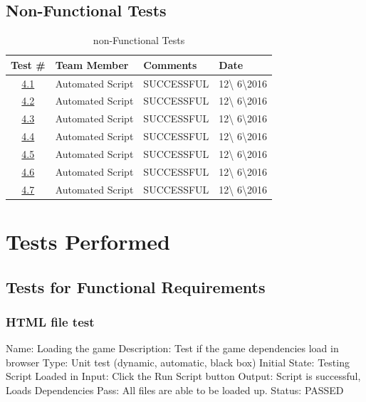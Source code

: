 \documentclass{article}
\begin{document}
\subsection{Non-Functional Tests}
\begin{table}[H]
\caption{non-Functional Tests}
	\begin{tabularx}{\textwidth}{| c | l | X | l |}
	\toprule
	Test \#& Team Member &Comments &Date\\
	\midrule
	\hyperref[sec:4.1]{4.1}& Automated Script  & SUCCESSFUL & 12\textbackslash
	6\textbackslash2016\\
	\hyperref[sec:4.2]{4.2}& Automated Script  & SUCCESSFUL & 12\textbackslash
	6\textbackslash2016\\
	\hyperref[sec:4.3]{4.3}& Automated Script  & SUCCESSFUL & 12\textbackslash
	6\textbackslash2016\\
	\hyperref[sec:4.4]{4.4}& Automated Script  & SUCCESSFUL & 12\textbackslash
	6\textbackslash2016\\
	\hyperref[sec:4.5]{4.5}& Automated Script  & SUCCESSFUL & 12\textbackslash
	6\textbackslash2016\\
	\hyperref[sec:4.6]{4.6}& Automated Script  & SUCCESSFUL & 12\textbackslash
	6\textbackslash2016\\
	\hyperref[sec:4.7]{4.7}& Automated Script  & SUCCESSFUL & 12\textbackslash
	6\textbackslash2016\\
	
		\bottomrule
	\end{tabularx}
\end{table}


\section{Tests Performed}
\subsection{Tests for Functional Requirements}
\subsubsection{HTML file test}
\label{sec:3.1.1}
Name:  Loading the game \newline
Description: Test if the game dependencies load in browser
\newline
Type: Unit test (dynamic, automatic, black box) \newline
Initial State:  Testing Script Loaded in \newline
Input: Click the Run Script button \newline
Output: Script is successful, Loads Dependencies \newline
Pass:  All files are able to be loaded up. \newline
\newline Status: PASSED
\end{document}
